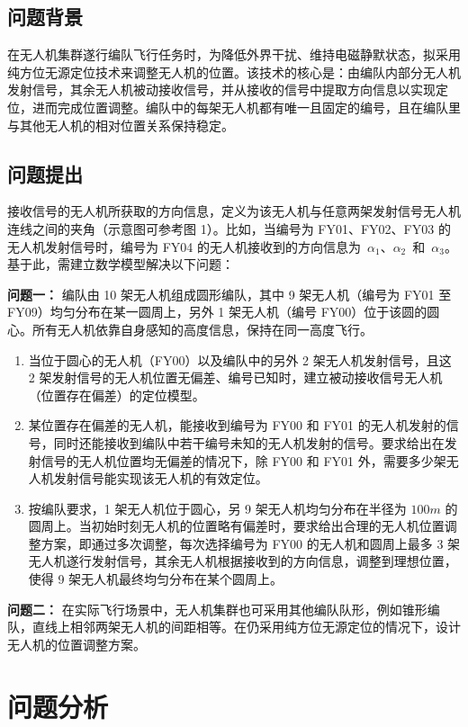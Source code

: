 \documentclass[withoutpreface,bwprint]{cumcmthesis} %
\begin{document}
\subsection{问题背景}
在无人机集群遂行编队飞行任务时，为降低外界干扰、维持电磁静默状态，拟采用纯方位无源定位技术来调整无人机的位置。该技术的核心是：由编队内部分无人机发射信号，其余无人机被动接收信号，并从接收的信号中提取方向信息以实现定位，进而完成位置调整。编队中的每架无人机都有唯一且固定的编号，且在编队里与其他无人机的相对位置关系保持稳定。

\subsection{问题提出}
接收信号的无人机所获取的方向信息，定义为该无人机与任意两架发射信号无人机连线之间的夹角（示意图可参考图 1）。比如，当编号为 FY01、FY02、FY03 的无人机发射信号时，编号为 FY04 的无人机接收到的方向信息为 \(\alpha_1\)、\(\alpha_2\) 和 \(\alpha_3\)。基于此，需建立数学模型解决以下问题：

\textbf{问题一：}
编队由 10 架无人机组成圆形编队，其中 9 架无人机（编号为 FY01 至 FY09）均匀分布在某一圆周上，另外 1 架无人机（编号 FY00）位于该圆的圆心。所有无人机依靠自身感知的高度信息，保持在同一高度飞行。

\begin{enumerate}
    \item 当位于圆心的无人机（FY00）以及编队中的另外 2 架无人机发射信号，且这 2 架发射信号的无人机位置无偏差、编号已知时，建立被动接收信号无人机（位置存在偏差）的定位模型。
    \item 某位置存在偏差的无人机，能接收到编号为 FY00 和 FY01 的无人机发射的信号，同时还能接收到编队中若干编号未知的无人机发射的信号。要求给出在发射信号的无人机位置均无偏差的情况下，除 FY00 和 FY01 外，需要多少架无人机发射信号能实现该无人机的有效定位。
    \item 按编队要求，1 架无人机位于圆心，另 9 架无人机均匀分布在半径为 $100m$ 的圆周上。当初始时刻无人机的位置略有偏差时，要求给出合理的无人机位置调整方案，即通过多次调整，每次选择编号为 FY00 的无人机和圆周上最多 3 架无人机遂行发射信号，其余无人机根据接收到的方向信息，调整到理想位置，使得 9 架无人机最终均匀分布在某个圆周上。
\end{enumerate}

\textbf{问题二：}
在实际飞行场景中，无人机集群也可采用其他编队队形，例如锥形编队，直线上相邻两架无人机的间距相等。在仍采用纯方位无源定位的情况下，设计无人机的位置调整方案。

\section{问题分析}
\end{document}
